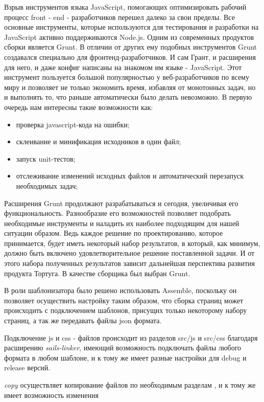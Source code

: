 Взрыв инструментов языка JavaScript, помогающих оптимизировать рабочий процесс front - end - разработчиков  перешел далеко за свои пределы. Все основные инструменты, которые используются для тестирования и разработки на JavaScript активно поддерживаются Node.js. Одним из современных продуктов сборки является Grunt. В отличии от других ему подобных инструментов Grunt создавался специально для фронтенд-разработчиков. И сам Грант, и расширения для него, и даже конфиг написаны на знакомом им языке - JavaScript. Этот инструмент пользуется большой популярностью у веб-разработчиков по всему миру и позволяет не только экономить время, избавляя от монотонных задач, но и выполнять то, что раньше автоматически было делать невозможно. В первую очередь нам интересны такие возможности как:


\begin{itemize}
  \item проверка javascript-кода на ошибки;
  \item склеивание и минификация исходников в один файл;
  \item запуск unit-тестов;
  \item отслеживание изменений исходных файлов и автоматический перезапуск необходимых задач;
\end{itemize}


Расширения Grunt продолжают разрабатываться и сегодня, увеличивая его функциональность. Разнообразие его возможностей позволяет подобрать необходимые инструменты и наладить их наиболее подходящим для нашей ситуации образом. Ведь каждое решение по проектированию, которое принимается, будет иметь некоторый набор результатов, в который, как минимум, должно быть включено удовлетворительное решение поставленной задачи. И от этого набора полученных результатов зависит дальнейшая перспектива развития продукта Тортуга. В качестве сборщика был выбран Grunt.

В роли шаблонизатора было решено использовать Assemble, поскольку он позволяет осуществить настройку  таким образом, что сборка страниц может происходить с подключением шаблонов, присущих только некоторому набору страниц, а так же передавать файлы json формата.

Подключение js и css - файлов происходит из разделов src/js и src/css благодаря расширению \textit{sails-linker}, имеющий возможность подключать файлы любого формата в любом шаблоне, и к тому же имеет разные настройки для debug и release версий.

\textit{copy} осуществляет копирование файлов по необходимым разделам , и к тому же имеет возможность изменения 

